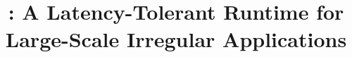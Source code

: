 
\usepackage{microtype}




\title{\Grappa: A Latency-Tolerant Runtime for Large-Scale Irregular Applications}


\date{}


\maketitle

\thispagestyle{empty}
\begin{abstract}

\end{abstract}




















%






